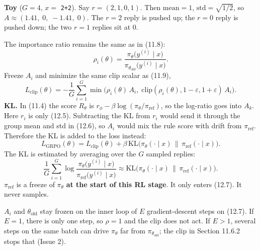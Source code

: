 \begin{asidenote}[Note]
\textbf{Toy} ($G=4$, $x=$ \texttt{2+2}). Say $r=(2,1,0,1)$. Then $\mathrm{mean}=1$, $\mathrm{std}=\sqrt{1/2}$, so $A\approx(1.41,\;0,\;-1.41,\;0)$. The $r=2$ reply is pushed up; the $r=0$ reply is pushed down; the two $r=1$ replies sit at $0$.

\end{asidenote}

The importance ratio remains the same as in (11.8): \[
\rho_i(\theta)
=
\frac{\pi_\theta\bigl(y^{(i)}\mid x\bigr)}{\pi_{\theta_{\mathrm{old}}}\bigl(y^{(i)}\mid x\bigr)}.
\] Freeze $A_i$ and minimize the same clip scalar as (11.9), \[
L_{\mathrm{clip}}(\theta)
=
-\frac1G\sum_{i=1}^{G}
\min\bigl(
\rho_i(\theta)\,A_i,\;
\mathrm{clip}(\rho_i(\theta),1-\varepsilon,1+\varepsilon)\,A_i
\bigr).
\] \textbf{KL.} In (11.4) the score $R_\theta$ is $r_\phi-\beta\log(\pi_\theta/\pi_{\mathrm{ref}})$, so the log-ratio goes into $A_k$. Here $r_i$ is only (12.5). Subtracting the KL from $r_i$ would send it through the group mean and std in (12.6), so $A_i$ would mix the rule score with drift from $\pi_{\mathrm{ref}}$. Therefore the KL is added to the loss instead: \begin{equation}
L_{\mathrm{GRPO}}(\theta)
=
L_{\mathrm{clip}}(\theta)
+
\beta\,\mathrm{KL}\bigl(\pi_\theta(\cdot\mid x)\,\|\,\pi_{\mathrm{ref}}(\cdot\mid x)\bigr).
\tag{12.7}
\end{equation} The KL is estimated by averaging over the $G$ sampled replies: \[
\frac1G\sum_{i=1}^{G}
\log\frac{\pi_\theta\bigl(y^{(i)}\mid x\bigr)}{\pi_{\mathrm{ref}}\bigl(y^{(i)}\mid x\bigr)}
\approx
\mathrm{KL}\bigl(\pi_\theta(\cdot\mid x)\,\|\,\pi_{\mathrm{ref}}(\cdot\mid x)\bigr).
\] $\pi_{\mathrm{ref}}$ is a freeze of $\pi_\theta$ \textbf{at the start of this RL stage}. It only enters (12.7). It never samples.

$A_i$ and $\theta_{\mathrm{old}}$ stay frozen on the inner loop of $E$ gradient-descent steps on (12.7). If $E=1$, there is only one step, so $\rho=1$ and the clip does not act. If $E>1$, several steps on the same batch can drive $\pi_\theta$ far from $\pi_{\theta_{\mathrm{old}}}$; the clip in Section 11.6.2 stops that (Issue 2).

